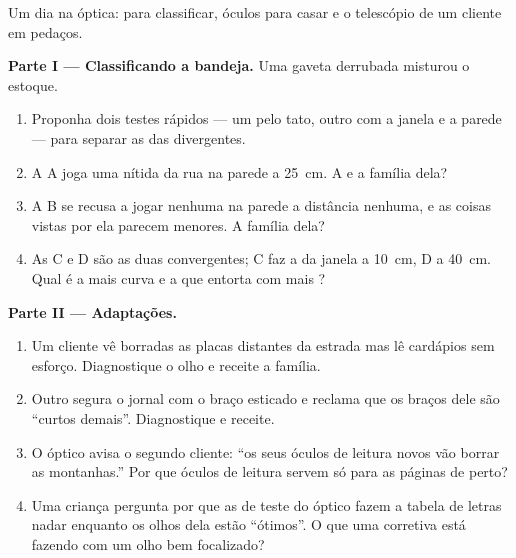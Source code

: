 \begin{problem}\label{pb:g8:lenses-images:1}
Um dia na óptica:  para classificar, óculos para casar e o
telescópio de um cliente em pedaços.

\medskip\noindent\textbf{Parte I --- Classificando a bandeja.}
Uma gaveta derrubada misturou o estoque.
\begin{enumerate}
  \item Proponha dois testes rápidos --- um pelo tato, outro com a
        janela e a parede --- para separar as  das
        divergentes.
  \item A  A joga uma  nítida da rua na parede a
        \qty{25}{cm}. A  e a família dela?
  \item A  B se recusa a jogar  nenhuma na parede a
        distância nenhuma, e as coisas vistas por ela parecem
        menores. A família dela?
  \item As  C e D são as duas convergentes; C faz a  da
        janela a \qty{10}{cm}, D a \qty{40}{cm}. Qual é a mais curva
        e a que entorta com mais ?
\end{enumerate}

\medskip\noindent\textbf{Parte II --- Adaptações.}
\begin{enumerate}[resume]
  \item Um cliente vê borradas as placas distantes da estrada mas lê
        cardápios sem esforço. Diagnostique o olho e receite a
        família.
  \item Outro segura o jornal com o braço esticado e reclama que os
        braços dele são ``curtos demais''. Diagnostique e receite.
  \item O óptico avisa o segundo cliente: ``os seus óculos de leitura
        novos vão borrar as montanhas.'' Por que óculos de leitura
        servem só para as páginas de perto?
  \item Uma criança pergunta por que as  de teste do óptico
        fazem a tabela de letras nadar enquanto os olhos dela estão
        ``ótimos''. O que uma  corretiva está fazendo com um
        olho bem focalizado?
\end{enumerate}


\end{problem}

